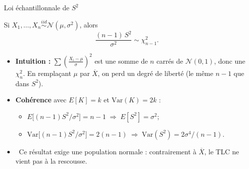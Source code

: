 \documentclass{BeamerTemplate}
\begin{document}
\begin{frame}[t]{Loi échantillonnale de $S^2$}
  \begin{thm}
    Si $X_1, \ldots, X_n \overset{iid}{\sim} \mathcal{N}(\mu, \sigma^2)$, alors
    $$\frac{(n-1)\,S^2}{\sigma^2} \sim \chi^2_{n-1}.$$
  \end{thm}

  \begin{itemize}\itemsep 2mm
    \item<2-> \textbf{Intuition :} $\sum \left(\frac{X_i - \mu}{\sigma}\right)^2$ est une somme de $n$ carrés de $\mathcal{N}(0,1)$, donc une $\chi^2_n$. En remplaçant $\mu$ par $\overline{X}$, on \alert{perd un degré de liberté} (le même $n - 1$ que dans $S^2$).
    \item<2-> \textbf{Cohérence} avec $E[K] = k$ et $\text{Var}(K) = 2k$ :
      \begin{itemize}
        \item $E\big[(n-1)S^2/\sigma^2\big] = n - 1 \;\Rightarrow\; E[S^2] = \sigma^2$;
        \item $\text{Var}\big[(n-1)S^2/\sigma^2\big] = 2(n-1) \;\Rightarrow\; \text{Var}(S^2) = 2\sigma^4/(n-1)$.
      \end{itemize}
    \item<2-> \faExclamationTriangle\ Ce résultat exige une population \alert{normale} : contrairement à $\overline{X}$, le TLC ne vient pas à la rescousse.
  \end{itemize}
\end{frame}
\end{document}

